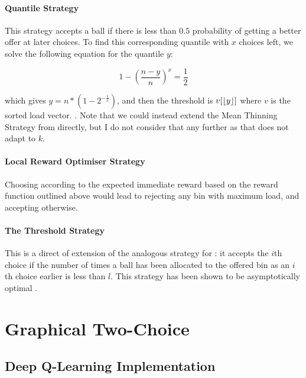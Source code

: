 \paragraph{Quantile Strategy} This strategy accepts a ball if there is less than $0.5$ probability of getting a better offer at later choices. To find this corresponding quantile with $x$ choices left, we solve the following equation for the quantile $y$:

\begin{equation} \label{meankthinning}
1 - (\frac{n-y}{n})^x = \frac{1}{2}
\end{equation}

which gives $y = n * (1 - 2^{-\frac{1}{x}})$, and then the threshold is $v[\lfloor y\rfloor]$ where $v$ is the sorted load vector. . Note that we could instead extend the Mean Thinning Strategy from \TwoThinning directly, but I do not consider that any further as that does not adapt to $k$.


\paragraph{Local Reward Optimiser Strategy} Choosing according to the expected immediate reward based on the reward function outlined above would lead to rejecting any bin with maximum load, and accepting otherwise.


\paragraph{The Threshold Strategy} This is a direct of extension of the analogous strategy for \TwoThinning: it accepts the $i$th choice if the number of times a ball has been allocated to the offered bin as an $i$th choice earlier is less than $l$. This strategy has been shown to be asymptotically optimal \cite{feldheim2020dthinning}.


\section{Graphical Two-Choice}



\subsection{Deep Q-Learning Implementation} \label{graphical-DQN}

